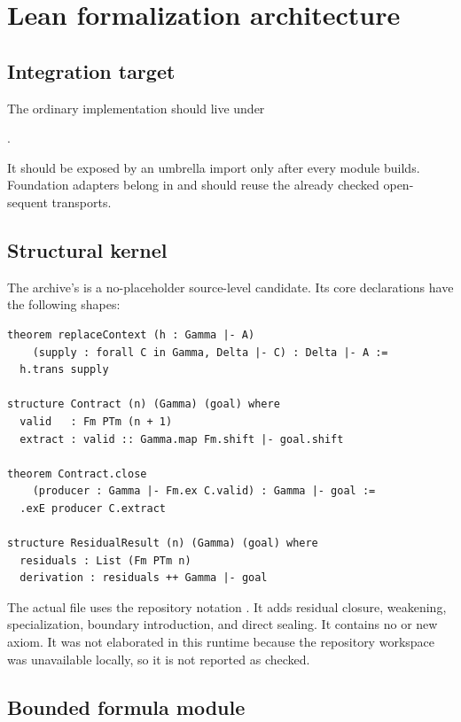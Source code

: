 \section{Lean formalization architecture}
\label{sec:lean-plan}

\subsection{Integration target}

The ordinary implementation should live under
\begin{center}
\allowbreak
{}.
\end{center}
It should be exposed by an umbrella import only after every module builds.  Foundation adapters belong in  and should reuse the already checked open-sequent transports.

\subsection{Structural kernel}

The archive's  is a no-placeholder source-level candidate.  Its core declarations have the following shapes:

\begin{lstlisting}
theorem replaceContext (h : Gamma |- A)
    (supply : forall C in Gamma, Delta |- C) : Delta |- A :=
  h.trans supply

structure Contract (n) (Gamma) (goal) where
  valid   : Fm PTm (n + 1)
  extract : valid :: Gamma.map Fm.shift |- goal.shift

theorem Contract.close
    (producer : Gamma |- Fm.ex C.valid) : Gamma |- goal :=
  .exE producer C.extract

structure ResidualResult (n) (Gamma) (goal) where
  residuals : List (Fm PTm n)
  derivation : residuals ++ Gamma |- goal
\end{lstlisting}

The actual file uses the repository notation .  It adds residual closure, weakening, specialization, boundary introduction, and direct sealing.  It contains no  or new axiom.  It was not elaborated in this runtime because the repository workspace was unavailable locally, so it is not reported as checked.

\subsection{Bounded formula module}

